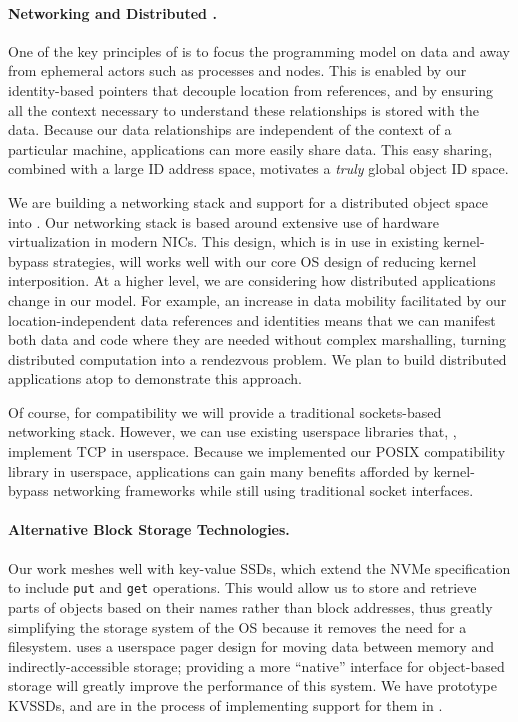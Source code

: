 {    \paragraph{Networking and Distributed \Twizzler.}

    One of the key principles of \Twizzler is to focus the programming model on data and away from
    ephemeral actors such as processes and nodes. This is enabled by our identity-based pointers that
    decouple location from references,
    and by ensuring all the context
    necessary to understand these relationships is stored with the data. Because our data relationships
    are independent of the context of a particular machine, applications can more easily share data.
    This easy sharing, combined with a large ID address space, motivates a \emph{truly} global object ID
    space.

    We are building a networking stack and support for a distributed object space into \Twizzler. Our
    networking stack is based around extensive use of hardware virtualization in modern NICs. This
    design, which is in use in existing kernel-bypass strategies, will works well with our core OS design
    of reducing kernel interposition. At a higher level, we are
    considering how distributed applications change in our model. For example, an increase in data
    mobility facilitated by our location-independent data references and identities
    means that we can manifest both data and code where they are needed without complex marshalling, turning
    distributed computation into a rendezvous problem. We plan to build distributed applications atop
    \Twizzler to demonstrate this approach.

    Of course, for compatibility we will provide a traditional sockets-based networking stack. However,
    we can use existing userspace libraries that, \eg, implement TCP in userspace.
    Because we implemented our POSIX compatibility library in userspace, applications can gain many
    benefits afforded by kernel-bypass networking frameworks while still using traditional socket
    interfaces.


    \paragraph{Alternative Block Storage Technologies.}

    Our work meshes well with key-value SSDs, which extend the NVMe
    specification to include \texttt{put} and \texttt{get} operations. This would allow us to store and
    retrieve parts of objects based on their names rather than block addresses, thus greatly
    simplifying the storage system of the OS because it removes the need for a filesystem. \Twizzler
    uses a userspace pager design for moving data between memory and indirectly-accessible storage;
    providing a more ``native'' interface for object-based storage will greatly improve the performance
    of this system. We have prototype KVSSDs, and are in the process of implementing support for them in
    \Twizzler.

}



